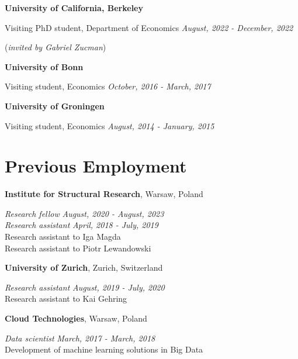 \documentclass[margin,line]{res}
\newenvironment{list1}{
  \begin{list}{\ding{113}}{%
      \setlength{\itemsep}{0in}
      \setlength{\parsep}{0in} \setlength{\parskip}{0in}
      \setlength{\topsep}{0in} \setlength{\partopsep}{0in} 
      \setlength{\leftmargin}{0.17in}}}{\end{list}}
\begin{document}
\begin{resume}
{\bf University of California, Berkeley}\\
\vspace*{-.1in}
\begin{list1}
	\item[] Visiting PhD student, Department of Economics \hfill \textit{August, 2022 - December, 2022}
	\item[] (\textit{invited by Gabriel Zucman})
\end{list1}

{\bf University of Bonn}\\
\vspace*{-.1in}
\begin{list1}
\item[] Visiting student, Economics \hfill \textit{October, 2016 - March, 2017}
\end{list1}

{\bf University of Groningen}\\
\vspace*{-.1in}
\begin{list1}
\item[] Visiting student, Economics \hfill \textit{August, 2014 - January, 2015}
\end{list1}

\section{\sc Previous Employment}

{\bf Institute for Structural Research}, Warsaw, Poland

\vspace{-.3cm}
{\em Research fellow} \hfill \textit{August, 2020 - August, 2023}\\
{\em Research assistant} \hfill \textit{April, 2018 - July, 2019}\\
Research assistant to Iga Magda\\ 
Research assistant to Piotr Lewandowski 
\vspace*{.05in} 

{\bf University of Zurich}, Zurich, Switzerland

\vspace{-.3cm}
{\em Research assistant} \hfill \textit{August, 2019 - July, 2020}\\
Research assistant to Kai Gehring
\vspace*{.05in}  

{\bf Cloud Technologies}, Warsaw, Poland

\vspace{-.3cm}
{\em Data scientist} \hfill \textit{March, 2017 - March, 2018}\\
Development of machine learning solutions in Big Data
\vspace*{.05in}  


\end{resume}
\end{document}
